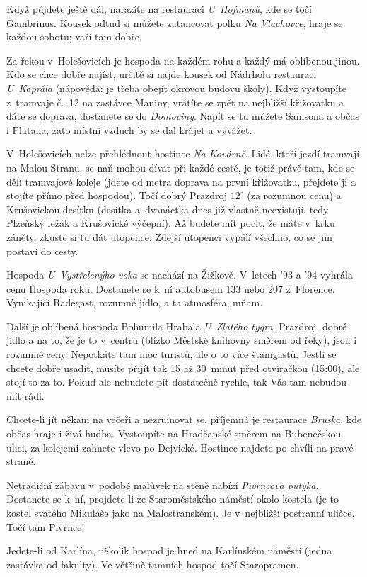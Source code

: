 Když půjdete ještě dál, narazíte na restauraci {\it U~Hofmanů},
kde se točí Gambrinus.  Kousek odtud si můžete zatancovat polku
{\it Na Vlachovce}, hraje se každou sobotu; vaří tam dobře.

Za řekou v~Holešovicích je hospoda na každém rohu a každý má oblíbenou
jinou.  Kdo se chce dobře najíst, určitě si najde kousek od Nádrholu
restauraci {\it U~Kaprála\/} (nápověda: je třeba obejít okrovou budovu
školy). Když vystoupíte z~tramvaje č.~12 na zastávce Maniny, vrátíte
se zpět na nejbližší křižovatku a dáte se doprava, dostanete se do
{\it Domoviny}. Napít se tu můžete Samsona a občas i Platana, zato místní
vzduch by se dal krájet a vyvážet.

V~Holešovicích nelze přehlédnout hostinec {\it Na Kovárně}. Lidé, kteří
jezdí tramvají na Malou Stranu, se naň mohou dívat při každé cestě, je
totiž právě tam, kde se dělí tramvajové koleje (jdete od metra doprava
na první křižovatku, přejdete ji a stojíte přímo před hospodou). Točí
dobrý Prazdroj $12^\circ$ (za rozumnou cenu) a Krušovickou desítku (desítka
a~dvanáctka dnes již vlastně neexistují, tedy Plzeňský ležák a Krušovické
výčepní). Až budete mít pocit, že máte v~krku záněty, zkuste si tu dát
utopence. Zdejší utopenci vypálí všechno, co se jim postaví do cesty.

Hospoda {\it U~Vystřelenýho voka\/} se nachází na Žižkově.
V~letech '93 a '94 vyhrála cenu Hospoda roku. Dostanete se k~ní
autobusem 133 nebo 207 z~Florence. Vynikající Radegast, rozumné
jídlo, a ta atmosféra, mňam.

Další je oblíbená hospoda Bohumila Hrabala {\it U~Zlatého tygra}.
Prazdroj, dobré jídlo a na to, že je to v~centru (blízko Městské
knihovny směrem od řeky), jsou i rozumné ceny. Nepotkáte tam moc
turistů, ale o to více štamgastů. Jestli se chcete dobře usadit,
musíte přijít tak 15 až 30~minut před otvíračkou (15:00), ale
stojí to za to. Pokud ale nebudete pít dostatečně rychle, tak Vás
tam nebudou mít rádi.

Chcete-li jít někam na večeři a nezruinovat se, příjemná je
restaurace {\it Bruska}, kde občas hraje i živá hudba. Vystoupíte
na Hradčanské směrem na Bubenečskou ulici, za kolejemi zahnete
vlevo po Dejvické. Hostinec najdete po chvíli na pravé straně.

Netradiční zábavu v~podobě malůvek na stěně nabízí {\it Pivrncova
putyka}. Dostanete se k~ní, projdete-li ze Staroměstského náměstí
okolo kostela (je to kostel svatého Mikuláše jako na
Malostranském). Je v~nejbližší postranní uličce. Točí tam Pivrnce!

Jedete-li od Karlína, několik hospod je hned na Karlínském náměstí
(jedna zastávka od fakulty). Ve většině tamních hospod točí
Staropramen.